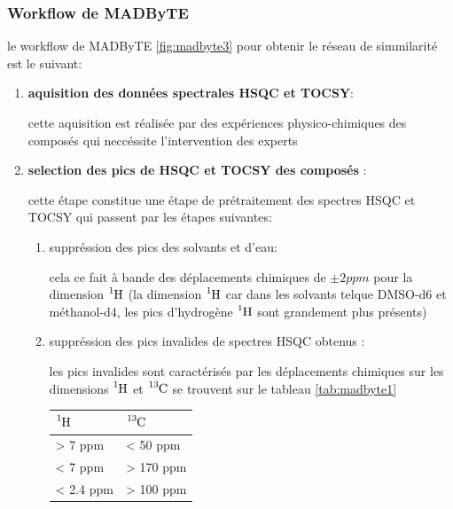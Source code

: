 \documentclass[letterpaper,twocolumn,10pt]{article}
\begin{document}
\subsubsection{Workflow de MADByTE}
    le workflow de MADByTE \ref{fig:madbyte3} pour obtenir le réseau de simmilarité est le suivant:
    \begin{enumerate}
        \item \textbf{aquisition des données spectrales HSQC et TOCSY}: 
        
        cette aquisition est réalisée par des expériences physico-chimiques des composés qui neccéssite l'intervention des experts
        \item \textbf{selection des pics de HSQC et TOCSY des composés} :
        
        cette étape constitue une étape de prétraitement des spectres HSQC et TOCSY qui passent par les étapes suivantes:
        \begin{enumerate}
            \item suppréssion des pics des solvants et d'eau: 
            
            cela ce fait à bande des déplacements chimiques de $\pm2ppm$ pour la dimension $\ce{^{1}_{}H}$ (la dimension $\ce{^{1}_{}H}$ car dans les solvants telque DMSO-d6 et méthanol-d4, les pics d'hydrogène $\ce{^{1}_{}H}$ sont grandement plus présents) 
            
            \item suppréssion des pics invalides de spectres HSQC obtenus : 
            
            les pics invalides sont caractérisés par les déplacements chimiques sur les dimensions $\ce{^{1}_{}H}$ et $\ce{^{13}_{}C}$ se trouvent sur le tableau \ref{tab:madbyte1} 
            \begin{center}
                \begin{tabular}{|C{2cm}|C{1cm}|}
                    \hline $\ce{^{1}_{}H}$  & $\ce{^{13}_{}C}$ \\
                    \hline  > 7 ppm & < 50 ppm\\
                    \hline  < 7 ppm & > 170 ppm\\
                    \hline  < 2.4 ppm & > 100 ppm\\
                    \hline 
                \end{tabular}
                \label{tab:madbyte1}
            \end{center}


\end{enumerate}
\end{enumerate}
\end{document}
